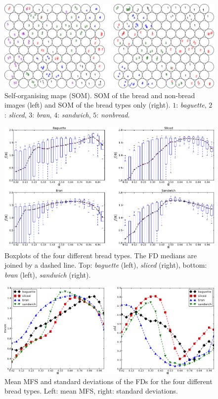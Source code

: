 \documentclass[spanish,a4paper,11pt,oneside,links]{report}
\begin{document}
\begin{figure}[h!]
\begin{centering}
\includegraphics{SOM}
\caption{Self-organising maps (SOM). SOM of the bread and non-bread images (left) and SOM of the bread types only (right). $1$: {\em baguette}, $2$: {\em sliced}, $3$: {\em bran}, $4$: {\em sandwich}, $5$: {\em nonbread}.}
\label{fig:somfractal}
\end{centering}
\end{figure}

\begin{figure}[h!]
\centering
\includegraphics{boxplots}
\caption{Boxplots of the four different bread types. The FD medians are joined by a dashed line. Top: {\em baguette} (left), {\em sliced} (right), bottom: {\em bran} (left), {\em sandwich} (right).}
\label{fig:boxplotsMFS}
\end{figure}

\begin{figure}[h!]
\centering
\includegraphics{panstd}
\caption{Mean MFS and standard deviations of the FDs for the four different bread types. Left: mean MFS, right: standard deviations.}
\label{fig:meansMFS}
\end{figure}
\end{document}
